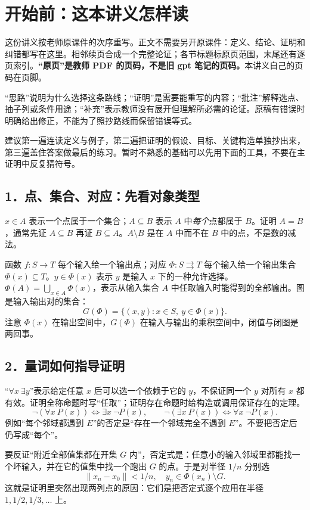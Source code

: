 \section*{开始前：这本讲义怎样读}
这份讲义按老师原课件的次序重写。正文不需要另开原课件：定义、结论、证明和纠错都写在这里。相邻续页合成一个完整论证；各节标题标原页范围，末尾还有逐页索引。\textbf{“原页”是教师 PDF 的页码，不是旧 gpt 笔记的页码。}本讲义自己的页码在页脚。

“思路”说明为什么选择这条路线；“证明”是需要能重写的内容；“批注”解释选点、抽子列或条件用途；“补充”表示教师没有展开但理解所必需的论证。原稿有错误时明确给出修正，不能为了照抄路线而保留错误等式。

建议第一遍连读定义与例子，第二遍把证明的假设、目标、关键构造单独抄出来，第三遍盖住答案做最后的练习。暂时不熟悉的基础可以先用下面的工具，不要在主证明中反复猜符号。

\subsection*{1．点、集合、对应：先看对象类型}
$x\in A$ 表示一个点属于一个集合；$A\subseteq B$ 表示 $A$ 中\emph{每个}点都属于 $B$。证明 $A=B$，通常先证 $A\subseteq B$ 再证 $B\subseteq A$。$A\setminus B$ 是在 $A$ 中而不在 $B$ 中的点，不是数的减法。

函数 $f:S\to T$ 每个输入给一个输出点；对应 $\Phi:S\rightrightarrows T$ 每个输入给一个输出集合 $\Phi(x)\subseteq T$。$y\in\Phi(x)$ 表示 $y$ 是输入 $x$ 下的一种允许选择。$\Phi(A)=\bigcup_{x\in A}\Phi(x)$，表示从输入集合 $A$ 中任取输入时能得到的全部输出。图是输入输出对的集合：
\[G(\Phi)=\{(x,y):x\in S,\ y\in\Phi(x)\}.\]
注意 $\Phi(x)$ 在输出空间中，$G(\Phi)$ 在输入与输出的乘积空间中，闭值与闭图是两回事。

\subsection*{2．量词如何指导证明}
“$\forall x\ \exists y$”表示给定任意 $x$ 后可以选一个依赖于它的 $y$，不保证同一个 $y$ 对所有 $x$ 都有效。证明全称命题时写“任取”；证明存在命题时给构造或调用保证存在的定理。
\[\neg(\forall x\ P(x))\iff\exists x\ \neg P(x),\qquad
\neg(\exists x\ P(x))\iff\forall x\ \neg P(x).\]
例如“每个邻域都遇到 $E$”的否定是“存在一个邻域完全不遇到 $E$”。不要把否定后仍写成“每个”。

要反证“附近全部值集都在开集 $G$ 内”，否定式是：任意小的输入邻域里都能找一个坏输入，并在它的值集中找一个跑出 $G$ 的点。于是对半径 $1/n$ 分别选
\[\|x_n-x_0\|<1/n,\quad y_n\in\Phi(x_n)\setminus G.\]
这就是证明里突然出现两列点的原因：它们是把否定式逐个应用在半径 $1,1/2,1/3,\ldots$ 上。

